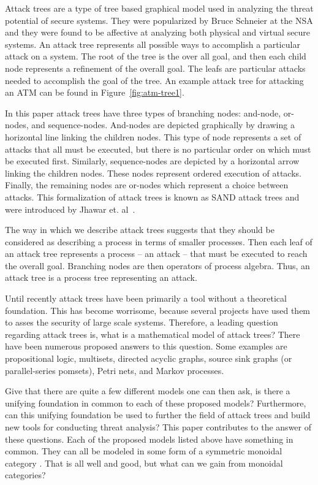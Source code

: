Attack trees are a type of tree based graphical model used in
analyzing the threat potential of secure systems.  They were
popularized by Bruce Schneier \cite{Schneier:1999} at the NSA and they
were found to be affective at analyzing both physical and virtual
secure systems.  An attack tree represents all possible ways to
accomplish a particular attack on a system.  The root of the tree is
the over all goal, and then each child node represents a refinement of
the overall goal.  The leafs are particular attacks needed to
accomplish the goal of the tree.  An example attack tree for attacking
an ATM can be found in Figure~\ref{fig:atm-tree1}.

In this paper attack trees have three types of branching nodes:
and-node, or-nodes, and sequence-nodes.  And-nodes are depicted
graphically by drawing a horizontal line linking the children nodes.
This type of node represents a set of attacks that all must be
executed, but there is no particular order on which must be executed
first. Similarly, sequence-nodes are depicted by a horizontal arrow
linking the children nodes.  These nodes represent ordered execution
of attacks.  Finally, the remaining nodes are or-nodes which represent
a choice between attacks.  This formalization of attack trees is known
as SAND attack trees and were introduced by Jhawar
et. al~\cite{Jhawar:2015}.

The way in which we describe attack trees suggests that they should be
considered as describing a process in terms of smaller processes.
Then each leaf of an attack tree represents a process -- an attack --
that must be executed to reach the overall goal.  Branching nodes are
then operators of process algebra.  Thus, an attack tree is a process
tree representing an attack.

Until recently attack trees have been primarily a tool without a
theoretical foundation.  This has become worrisome, because several
projects have used them to asses the security of large scale systems.
Therefore, a leading question regarding attack trees is, what is a
mathematical model of attack trees?  There have been numerous proposed
answers to this question.  Some examples are propositional logic,
multisets, directed acyclic graphs, source sink graphs (or
parallel-series pomsets), Petri nets, and Markov processes.

Give that there are quite a few different models one can then ask, is
there a unifying foundation in common to each of these proposed
models?  Furthermore, can this unifying foundation be used to further
the field of attack trees and build new tools for conducting threat
analysis?  This paper contributes to the answer of these questions.
Each of the proposed models listed above have something in common.
They can all be modeled in some form of a symmetric monoidal category
\cite{Tzouvaras:1998,Brown:1991,Fiore:2013,FrancescoAlbasini2010}.
That is all well and good, but what can we gain from monoidal
categories?

